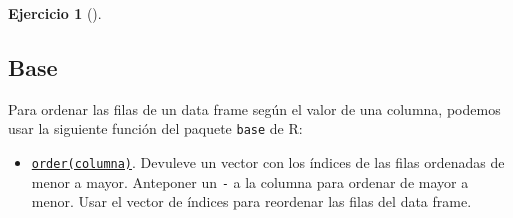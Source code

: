\documentclass[
  a4paper,
]{scrreport}
\newenvironment{Shaded}{\begin{snugshade}}{\end{snugshade}}
\newcommand{\FunctionTok}[1]{\textcolor[rgb]{0.28,0.35,0.67}{#1}}
\newcommand{\NormalTok}[1]{\textcolor[rgb]{0.00,0.23,0.31}{#1}}
\newcommand{\SpecialCharTok}[1]{\textcolor[rgb]{0.37,0.37,0.37}{#1}}
\providecommand{\tightlist}{%
  \setlength{\itemsep}{0pt}\setlength{\parskip}{0pt}}\usepackage{longtable,booktabs,array}
\theoremstyle{definition}
\newtheorem{exercise}{Ejercicio}[chapter]
\theoremstyle{remark}
\begin{document}
\begin{exercise}[]
\begin{enumerate}
  \begin{tcolorbox}[enhanced jigsaw, colframe=quarto-callout-tip-color-frame, toprule=.15mm, bottomtitle=1mm, breakable, opacitybacktitle=0.6, toptitle=1mm, colback=white, bottomrule=.15mm, title=\textcolor{quarto-callout-tip-color}{\faLightbulb}\hspace{0.5em}{Solución}, arc=.35mm, left=2mm, titlerule=0mm, rightrule=.15mm, coltitle=black, leftrule=.75mm, opacityback=0, colbacktitle=quarto-callout-tip-color!10!white]

  \section{Base}

  Para ordenar las filas de un data frame según el valor de una columna,
  podemos usar la siguiente función del paquete \texttt{base} de R:

  \begin{itemize}
  \tightlist
  \item
    \href{https://rdrr.io/r/base/order.html}{\texttt{order(columna)}}.
    Devuleve un vector con los índices de las filas ordenadas de menor a
    mayor. Anteponer un \texttt{-} a la columna para ordenar de mayor a
    menor. Usar el vector de índices para reordenar las filas del data
    frame.
  \end{itemize}

\begin{Shaded}
\end{Shaded}


\end{tcolorbox}
\end{enumerate}
\end{exercise}
\end{document}
